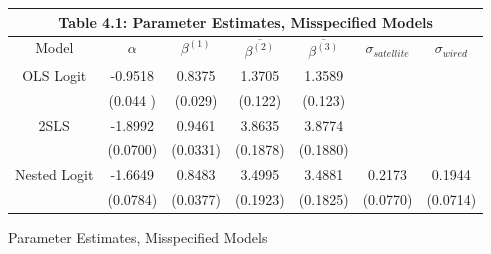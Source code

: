 
\begin{figure}
\centering
\begin{tabular}{ |c|c|c|c|c|c|c| }
 \hline
 \multicolumn{7}{|c|}{Table 4.1: Parameter Estimates, Misspecified Models} \\
 \hline
 Model & $\alpha$ & $\beta^{(1)}$ & $\overline{\beta^{(2)}}$ & $\overline{\beta^{(3)}}$ & $\sigma_{satellite}$ & $\sigma_{wired}$ \\
 \hline
 OLS Logit & -0.9518 & 0.8375  & 1.3705 &  1.3589 &  & \\
 & (0.044 ) & (0.029) & (0.122) & (0.123) &  &  \\
 \hline
 2SLS & -1.8992 & 0.9461 & 3.8635 &  3.8774 &  & \\
 & (0.0700) & (0.0331) & (0.1878) & (0.1880) &  &  \\
 \hline
 Nested Logit & -1.6649  & 0.8483 & 3.4995 &  3.4881 & 0.2173 & 0.1944 \\
 & (0.0784) & (0.0377) & (0.1923) & (0.1825) & (0.0770) & (0.0714) \\
 \hline
\end{tabular}
\label{table4_1}
\caption{Parameter Estimates, Misspecified Models}
\end{figure}
